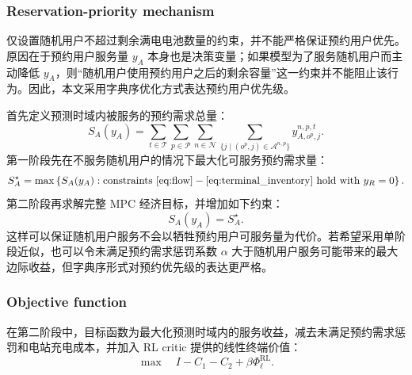 \documentclass[12pt,hyperref,a4paper,UTF8]{ctexart}
\begin{document}
\subsubsection{Reservation-priority mechanism}

仅设置随机用户不超过剩余满电电池数量的约束，并不能严格保证预约用户优先。原因在于预约用户服务量 $y_A$ 本身也是决策变量；如果模型为了服务随机用户而主动降低 $y_A$，则“随机用户使用预约用户之后的剩余容量”这一约束并不能阻止该行为。因此，本文采用字典序优化方式表达预约用户优先级。

首先定义预测时域内被服务的预约需求总量：
\begin{equation}
S_A(y_A)=
\sum_{t\in\mathcal{T}}\sum_{p\in\mathcal{P}}\sum_{n\in\mathcal{N}}
\sum_{\{j\mid (o^p,j)\in\mathcal{A}^{n,p}\}}
y_{A,o^p,j}^{n,p,t}.
\label{eq:served_reservation_total}
\end{equation}
第一阶段先在不服务随机用户的情况下最大化可服务预约需求量：
\begin{equation}
S_A^{\star}=\max \left\{S_A(y_A): \text{constraints }\eqref{eq:flow}-\eqref{eq:terminal_inventory}\text{ hold with }y_R=0\right\}.
\label{eq:first_stage_priority}
\end{equation}
第二阶段再求解完整 MPC 经济目标，并增加如下约束：
\begin{equation}
S_A(y_A)=S_A^{\star}.
\label{eq:reservation_priority_fix}
\end{equation}
这样可以保证随机用户服务不会以牺牲预约用户可服务量为代价。若希望采用单阶段近似，也可以令未满足预约需求惩罚系数 $\alpha$ 大于随机用户服务可能带来的最大边际收益，但字典序形式对预约优先级的表达更严格。

\subsubsection{Objective function}

在第二阶段中，目标函数为最大化预测时域内的服务收益，减去未满足预约需求惩罚和电站充电成本，并加入 RL critic 提供的线性终端价值：
\begin{equation}
\max \quad I-C_1-C_2+\beta\Phi^{\mathrm{RL}}_{\ell}.
\label{eq:objective}
\end{equation}
\end{document}
